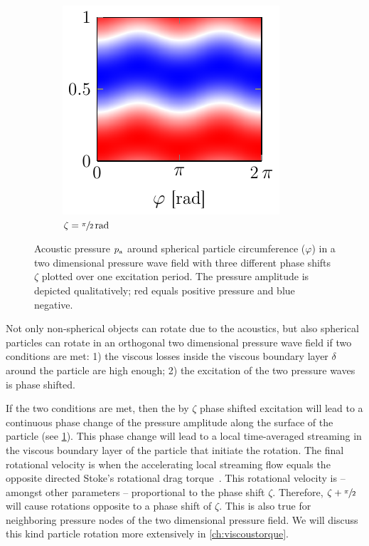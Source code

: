 \begin{figure}
\begin{subfigure}[b]{0.3\textwidth}
    \centering
    \caption{$\zeta = \sfrac{\pi}{2}\,\si{\radian}$}
    \includegraphics[]{External/viscous_torque_2.pdf}
  \end{subfigure}
  \caption{Acoustic pressure $p_{\mathrm{a}}$ around spherical particle 
      circumference ($\varphi$) in a two dimensional pressure wave field with 
      three different phase shifts $\zeta$ plotted over one excitation period. 
      The pressure amplitude is depicted qualitatively; red equals positive 
  pressure and blue negative.}
  \label{fig:TA-VT}
 \end{figure}

Not only non-spherical objects can rotate due to the acoustics, but also 
spherical particles can rotate in an orthogonal two dimensional pressure wave 
field if two conditions are met: 1) the viscous losses inside the viscous 
boundary layer $\delta$ around the particle are high enough; 2) the excitation 
of the two pressure waves is phase shifted.

If the two conditions are met, then the by $\zeta$ phase shifted excitation 
will lead to a continuous phase change of the pressure amplitude along the 
surface of the particle (see \cref{fig:TA-VT}). This phase change will lead to 
a local time-averaged streaming in the viscous boundary layer of the particle 
that initiate the rotation. The final rotational velocity is when the 
accelerating local streaming flow equals the opposite directed Stoke's 
rotational drag torque~\cite{Lamprecht2017}. This rotational velocity is -- 
amongst other parameters -- proportional to the phase shift $\zeta$. Therefore, 
$\zeta + \sfrac{\pi}{2}$ will cause rotations opposite to a phase shift of 
$\zeta$. This is also true for neighboring pressure nodes of the two 
dimensional pressure field. We will discuss this kind particle rotation more 
extensively in \cref{ch:viscoustorque}.

